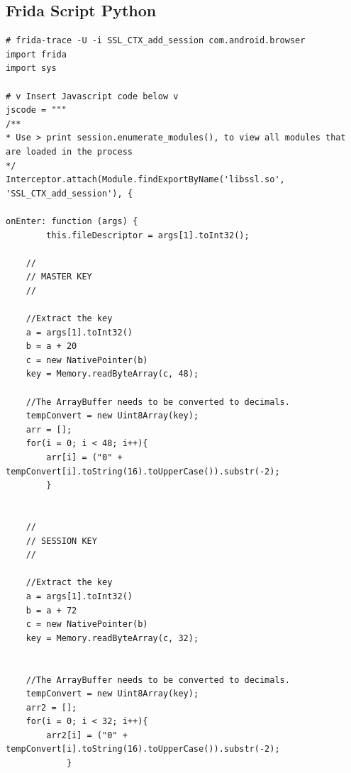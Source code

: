 \documentclass[12pt, a4paper]{report}
\begin{document}
\begin{appendices}


\section{Frida Script Python}

\begin{lstlisting}[frame=single, breaklines=true]
# frida-trace -U -i SSL_CTX_add_session com.android.browser
import frida
import sys
 
# v Insert Javascript code below v
jscode = """
/**
* Use > print session.enumerate_modules(), to view all modules that are loaded in the process
*/ 
Interceptor.attach(Module.findExportByName('libssl.so', 'SSL_CTX_add_session'), {
 
onEnter: function (args) { 	
        this.fileDescriptor = args[1].toInt32();
 
	// 
	// MASTER KEY
	// 
 
	//Extract the key
	a = args[1].toInt32()
	b = a + 20
	c = new NativePointer(b)
	key = Memory.readByteArray(c, 48);
 
	//The ArrayBuffer needs to be converted to decimals. 
	tempConvert = new Uint8Array(key);
	arr = [];
	for(i = 0; i < 48; i++){
		arr[i] = ("0" + tempConvert[i].toString(16).toUpperCase()).substr(-2);
		}
 
 
	//
	// SESSION KEY
	//
 
	//Extract the key
	a = args[1].toInt32()
	b = a + 72
	c = new NativePointer(b)
	key = Memory.readByteArray(c, 32);
 
 
	//The ArrayBuffer needs to be converted to decimals. 
	tempConvert = new Uint8Array(key);
	arr2 = [];
	for(i = 0; i < 32; i++){
		arr2[i] = ("0" + tempConvert[i].toString(16).toUpperCase()).substr(-2);
			}
 

\end{lstlisting}
\end{appendices}
\end{document}
